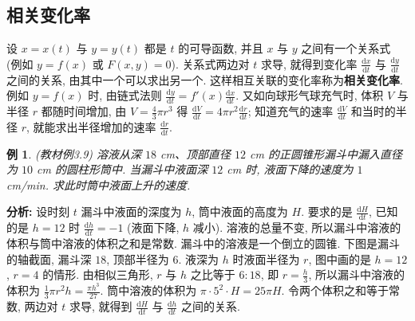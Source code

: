 \documentclass[UTF8,openany]{ctexbook}
\theoremstyle{chinesetextbook}
\newtheorem{example}{例}[section]
\newcommand{\dd}{\mathrm d}
\begin{document}
\subsection{相关变化率}
设 $x=x(t)$ 与 $y=y(t)$ 都是 $t$ 的可导函数, 并且 $x$ 与 $y$ 之间有一个关系式 (例如 $y=f(x)$ 或 $F(x,y)=0$). 关系式两边对 $t$ 求导, 就得到变化率 $\displaystyle\frac{\dd x}{\dd t}$ 与 $\displaystyle\frac{\dd y}{\dd t}$ 之间的关系, 由其中一个可以求出另一个. 这样相互关联的变化率称为\textbf{相关变化率}. 例如 $y=f(x)$ 时, 由链式法则 $\displaystyle\frac{\dd y}{\dd t}=f'(x)\frac{\dd x}{\dd t}$. 又如向球形气球充气时, 体积 $V$ 与半径 $r$ 都随时间增加, 由 $\displaystyle V=\frac43\pi r^3$ 得 $\displaystyle\frac{\dd V}{\dd t}=4\pi r^2\frac{\dd r}{\dd t}$; 知道充气的速率 $\displaystyle\frac{\dd V}{\dd t}$ 和当时的半径 $r$, 就能求出半径增加的速率 $\displaystyle\frac{\dd r}{\dd t}$.
\begin{example}\label{ex:c2-3-9}
\textnormal{(教材例3.9)} 溶液从深 $18$ cm、顶部直径 $12$ cm 的正圆锥形漏斗中漏入直径为 $10$ cm 的圆柱形筒中. 当漏斗中液面深 $12$ cm 时, 液面下降的速度为 $1$ cm/min. 求此时筒中液面上升的速度.
\end{example}
\par\indent\textbf{分析:} 设时刻 $t$ 漏斗中液面的深度为 $h$, 筒中液面的高度为 $H$. 要求的是 $\displaystyle\frac{\dd H}{\dd t}$, 已知的是 $h=12$ 时 $\displaystyle\frac{\dd h}{\dd t}=-1$ (液面下降, $h$ 减小). 溶液的总量不变, 所以漏斗中溶液的体积与筒中溶液的体积之和是常数. 漏斗中的溶液是一个倒立的圆锥. 下图是漏斗的轴截面, 漏斗深 $18$, 顶部半径为 $6$. 液深为 $h$ 时液面半径为 $r$, 图中画的是 $h=12$, $r=4$ 的情形. 由相似三角形, $r$ 与 $h$ 之比等于 $6:18$, 即 $\displaystyle r=\frac h3$, 所以漏斗中溶液的体积为 $\displaystyle\frac13\pi r^2h=\frac{\pi h^3}{27}$. 筒中溶液的体积为 $\pi\cdot5^2\cdot H=25\pi H$. 令两个体积之和等于常数, 两边对 $t$ 求导, 就得到 $\displaystyle\frac{\dd H}{\dd t}$ 与 $\displaystyle\frac{\dd h}{\dd t}$ 之间的关系.
\begin{center}
\end{center}
\end{document}
